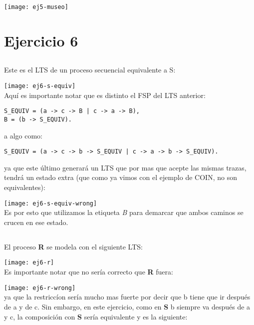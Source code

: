 \texttt{[image: ej5-museo]}

\section{Ejercicio 6}
\subsection{}
Este es el LTS de un proceso secuencial equivalente a S:

\texttt{[image: ej6-s-equiv]} \\

Aquí es importante notar que es distinto el FSP del LTS anterior: \\

\begin{verbatim}
S_EQUIV = (a -> c -> B | c -> a -> B),
B = (b -> S_EQUIV).
\end{verbatim}

a algo como:

\begin{verbatim}
S_EQUIV = (a -> c -> b -> S_EQUIV | c -> a -> b -> S_EQUIV).
\end{verbatim}

ya que este último generará un LTS que por mas que acepte las mismas trazas, tendrá un estado extra (que como ya vimos con el ejemplo de COIN, no son equivalentes):

\texttt{[image: ej6-s-equiv-wrong]} \\

Es por esto que utilizamos la etiqueta \textit{B} para demarcar que ambos caminos se crucen en ese estado.

\subsection{}
El proceso \textbf{R} se modela con el siguiente LTS:

\texttt{[image: ej6-r]} \\

Es importante notar que no sería correcto que \textbf{R} fuera:

\texttt{[image: ej6-r-wrong]} \\

ya que la restriccíon sería mucho mas fuerte por decir que b tiene que ir después de a y de c. Sin embargo, en este ejercicio, como en \textbf{S} b siempre va después de a y c, la composición con \textbf{S} sería equivalente y es la siguiente:

